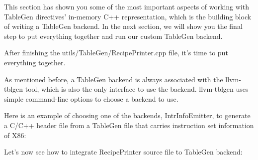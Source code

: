 This section has shown you some of the most important aspects of working with TableGen directives' in-memory C++ representation, which is the building block of writing a TableGen backend. In the next section, we will show you the final step to put everything together and run our custom TableGen backend.


After finishing the utils/TableGen/RecipePrinter.cpp file, it's time to put everything together.

As mentioned before, a TableGen backend is always associated with the llvm-tblgen tool, which is also the only interface to use the backend. llvm-tblgen uses simple command-line options to choose a backend to use.

Here is an example of choosing one of the backends, IntrInfoEmitter, to generate a C/C++ header file from a TableGen file  that carries instruction set information of X86:


Let's now see how to integrate RecipePrinter source file to TableGen backend:

